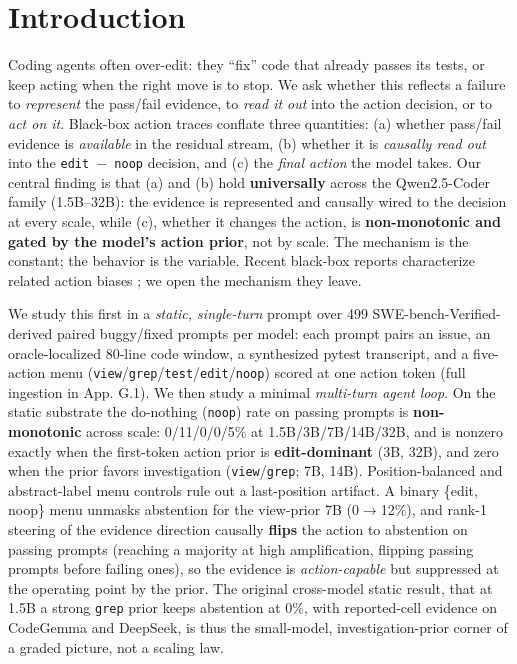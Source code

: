 \documentclass[
  11pt,
  a4paper]{article}
\begin{document}
\section{Introduction}\label{introduction}

Coding agents often over-edit: they ``fix'' code that already passes its
tests, or keep acting when the right move is to stop. We ask whether
this reflects a failure to \emph{represent} the pass/fail evidence, to
\emph{read it out} into the action decision, or to \emph{act on it}.
Black-box action traces conflate three quantities: (a) whether pass/fail
evidence is \emph{available} in the residual stream, (b) whether it is
\emph{causally read out} into the \texttt{edit\ \ensuremath{-}\ noop} decision, and
(c) the \emph{final action} the model takes. Our central finding is that
(a) and (b) hold \textbf{universally} across the Qwen2.5-Coder family
(1.5B--32B): the evidence is represented and causally wired to the
decision at every scale, while (c), whether it changes the action, is
\textbf{non-monotonic and gated by the model's action prior}, not by
scale. The mechanism is the constant; the behavior is the variable.
Recent black-box reports characterize related action biases
\citep{shang2026tebench, fixedbench2025}; we open the mechanism they
leave.

We study this first in a \emph{static, single-turn} prompt over 499
SWE-bench-Verified-derived paired buggy/fixed prompts per model: each
prompt pairs an issue, an oracle-localized 80-line code window, a
synthesized pytest transcript, and a five-action menu
(\texttt{view}/\texttt{grep}/\texttt{test}/\texttt{edit}/\texttt{noop})
scored at one action token (full ingestion in App. G.1). We then study a
minimal \emph{multi-turn agent loop}. On the static substrate the
do-nothing (\texttt{noop}) rate on passing prompts is
\textbf{non-monotonic} across scale: 0/11/0/0/5\% at 1.5B/3B/7B/14B/32B,
and is nonzero exactly when the first-token action prior is
\textbf{edit-dominant} (3B, 32B), and zero when the prior favors
investigation (\texttt{view}/\texttt{grep}; 7B, 14B). Position-balanced
and abstract-label menu controls rule out a last-position artifact. A
binary \{edit, noop\} menu unmasks abstention for the view-prior 7B
(0\ensuremath{\rightarrow}12\%), and rank-1 steering of the evidence direction causally
\textbf{flips} the action to abstention on passing prompts (reaching a
majority at high amplification, flipping passing prompts before failing
ones), so the evidence is \emph{action-capable} but suppressed at the
operating point by the prior. The original cross-model static result,
that at 1.5B a strong \texttt{grep} prior keeps abstention at 0\%, with
reported-cell evidence on CodeGemma and DeepSeek, is thus the
small-model, investigation-prior corner of a graded picture, not a
scaling law.
\end{document}
